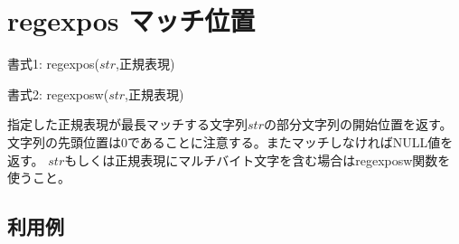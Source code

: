 
%

\section{regexpos マッチ位置\label{sect:regexpos}}

書式1: regexpos($str$,正規表現)

書式2: regexposw($str$,正規表現)

指定した正規表現が最長マッチする文字列$str$の部分文字列の開始位置を返す。
文字列の先頭位置は0であることに注意する。またマッチしなければNULL値を返す。
$str$もしくは正規表現にマルチバイト文字を含む場合はregexposw関数を使うこと。

\subsection*{利用例}


%

